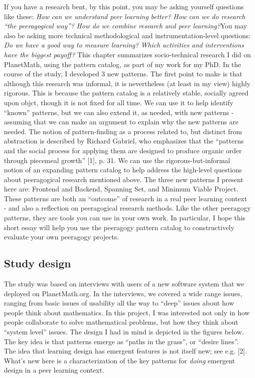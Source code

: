 If you have a research bent, by this point, you may be asking yourself
questions like these: \emph{How can we understand peer learning better?}
\emph{How can we do research ``the peeragogical way''?} \emph{How do we
combine research and peer learning?}You may also be asking more
technical methodological and instrumentation-level questions: \emph{Do
we have a good way to measure learning?} \emph{Which activities and
interventions have the biggest payoff?} This chapter summarizes
socio-technical research I did on PlanetMath, using the pattern catalog,
as part of my work for my PhD. In the course of the study, I developed 3
new patterns. The first point to make is that although this research was
informal, it is nevertheless (at least in my view) highly rigorous. This
is because the pattern catalog is a relatively stable, socially agreed
upon objct, though it is not fixed for all time. We can use it to help
identify ``known'' patterns, but we can also extend it, as needed, with
new patterns - assuming that we can make an argument to explain why the
new patterns are needed. The notion of pattern-finding as a process
related to, but distinct from abstraction is described by Richard
Gabriel, who emphasizes that the ``patterns and the social process for
applying them are designed to produce organic order through piecemeal
growth'' {[}1{]}, p. 31. We can use the rigorous-but-informal notion of
an expanding pattern catalog to help address the high-level questions
about peeragogical research mentioned above. The three new patterns I
present here are: Frontend and Backend, Spanning Set, and Minimum Viable
Project. These patterns are both an ``outcome'' of research in a real
peer learning context - and also a reflection on peeragogical research
methods. Like the other peeragogy patterns, they are tools you can use
in your own work. In particular, I hope this short essay will help you
use the peeragogy pattern catalog to constructively evaluate your own
peeragogy projects.

\subsection{Study design}

The study was based on interviews with users of a new software system
that we deployed on PlanetMath.org. In the interviews, we covered a wide
range issues, ranging from basic issues of usability all the way to
``deep'' issues about how people think about mathematics. In this
project, I was interested not only in how people collaborate to solve
mathematical problems, but how they think about ``system level'' issues.
The design I had in mind is depicted in the figures below. The key idea
is that patterns emerge as ``paths in the grass'', or ``desire lines''.
The idea that learning design has emergent features is not itself new;
see e.g. {[}2{]}. What's new here is a characterization of the key
patterns for \emph{doing} emergent design in a peer learning context.

